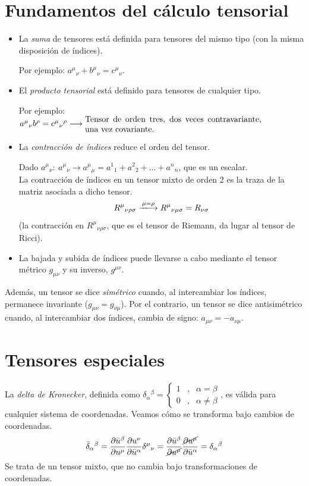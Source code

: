 \section{Fundamentos del cálculo tensorial}
\begin{itemize}
   \item La \emph{suma} de tensores está definida para tensores del mismo tipo (con la misma disposición de índices).

    Por ejemplo: $a^\mu {}_\nu +b^\mu {}_\nu =c^\mu {}_\nu $.\\

   \item El \emph{producto tensorial} está definido para tensores de cualquier tipo.

    Por ejemplo: $a^\mu {}_\nu b^\rho =c^\mu {}_\nu {}^\rho \longrightarrow \text{\parbox{7.5cm}{Tensor de orden tres, dos veces contravariante, una vez covariante.}}$

    \item La \emph{contracción de índices} reduce el orden del tensor.

    Dado $a^\mu {}_\nu:\ a^\mu {}_\nu \longrightarrow a^\mu {}_\mu =a^1{}_1+a^2{}_2+\ldots +a^n{}_n$, que es un escalar.\\

    La contracción de índices en un tensor mixto de orden 2 es la traza de la matriz asociada a dicho tensor.
    $$
    R^\mu {}_{\nu \rho \sigma }\xlongrightarrow{\mu =\rho } R^\mu {}_{\nu \mu \sigma }=R_{\nu \sigma }
    $$
    (la contracción en $R^\mu {}_{\nu \rho \sigma}$, que es el tensor de Riemann, da lugar al tensor de Ricci).

    \item La bajada y subida de índices puede llevarse a cabo mediante el tensor métrico $g_{\mu \nu}$ y su inverso, $g^{\mu \nu}$.
\end{itemize}

Además, un tensor se dice \emph{simétrico} cuando, al intercambiar los índices, permanece invariante ($g_{\mu \nu}=g_{\nu \mu}$). Por el contrario, un tensor se dice antisimétrico cuando, al intercambiar dos índices, cambia de signo: $a_{\mu \nu}=-a_{\nu \mu}$.
\section{Tensores especiales}
La \emph{delta de Kronecker}, definida como $\delta _\alpha {}^\beta= \left \{ 
\begin{array}{ccc}
     1&,&\alpha =\beta   \\
     0&,&\alpha \neq \beta  
\end{array}  \right .$, es válida para cualquier sistema de coordenadas. Veamos cómo se transforma bajo cambios de coordenadas.
$$
\Bar{\delta }_\alpha {}^\beta =\pdv{\Bar{u}^\beta }{u^\mu }\pdv{u^\nu }{\Bar{u}^\alpha }\delta ^\mu {}_\nu =\frac{\partial \Bar{u}^\beta}{\cancel{\partial u^\mu}}\frac{\cancel{\partial u^\mu}}{\partial \Bar{u}^\alpha}=\delta _\alpha {}^\beta 
$$
Se trata de un tensor mixto, que no cambia bajo transformaciones de coordenadas.\\

